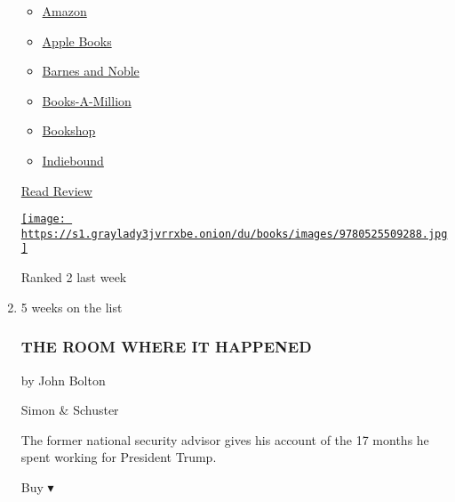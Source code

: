 \begin{enumerate}
  \begin{itemize}
  \tightlist
  \item
    \href{https://www.amazon.com/How-Be-Antiracist-Ibram-Kendi/dp/0525509283?tag=NYTBS-20}{Amazon}
  \item
    \href{https://du-gae-books-dot-nyt-du-prd.appspot.com/buy?title=HOW+TO+BE+AN+ANTIRACIST\&author=Ibram+X+Kendi}{Apple
    Books}
  \item
    \href{https://www.anrdoezrs.net/click-7990613-11819508?url=https\%3A\%2F\%2Fwww.barnesandnoble.com\%2Fw\%2F\%3Fean\%3D9780525509288}{Barnes
    and Noble}
  \item
    \href{https://www.anrdoezrs.net/click-7990613-35140?url=https\%3A\%2F\%2Fwww.booksamillion.com\%2Fp\%2FHOW\%2BTO\%2BBE\%2BAN\%2BANTIRACIST\%2FIbram\%2BX\%2BKendi\%2F9780525509288}{Books-A-Million}
  \item
    \href{https://bookshop.org/a/3546/9780525509288}{Bookshop}
  \item
    \href{https://www.indiebound.org/book/9780525509288?aff=NYT}{Indiebound}
  \end{itemize}

  \href{https://www.nytimes3xbfgragh.onion/2019/08/20/books/review/how-to-be-an-antiracist-ibram-x-kendi.html}{Read
  Review}

  \href{https://www.nytimes3xbfgragh.onion/2019/08/20/books/review/how-to-be-an-antiracist-ibram-x-kendi.html}{\texttt{[image: https://s1.graylady3jvrrxbe.onion/du/books/images/9780525509288.jpg]}}

  Ranked 2 last week
\item
  5 weeks on the list

  \hypertarget{the-room-where-it-happened}{%
  \subsubsection{THE ROOM WHERE IT
  HAPPENED}\label{the-room-where-it-happened}}

  by John Bolton

  Simon \& Schuster

  The former national security advisor gives his account of the 17
  months he spent working for President Trump.

  Buy ▾


\end{enumerate}
